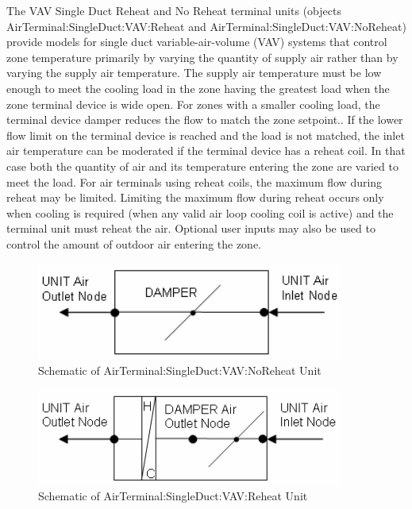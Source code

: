 The VAV Single Duct Reheat and No Reheat terminal units (objects AirTerminal:SingleDuct:VAV:Reheat and AirTerminal:SingleDuct:VAV:NoReheat) provide models for single duct variable-air-volume (VAV) systems that control zone temperature primarily by varying the quantity of supply air rather than by varying the supply air temperature. The supply air temperature must be low enough to meet the cooling load in the zone having the greatest load when the zone terminal device is wide open. For zones with a smaller cooling load, the terminal device damper reduces the flow to match the zone setpoint.. If the lower flow limit on the terminal device is reached and the load is not matched, the inlet air temperature can be moderated if the terminal device has a reheat coil. In that case both the quantity of air and its temperature entering the zone are varied to meet the load. For air terminals using reheat coils, the maximum flow during reheat may be limited. Limiting the maximum flow during reheat occurs only when cooling is required (when any valid air loop cooling coil is active) and the terminal unit must reheat the air. Optional user inputs may also be used to control the amount of outdoor air entering the zone.

\begin{figure}[hbtp] %
\centering
\includegraphics[width=0.9\textwidth, height=0.9\textheight, keepaspectratio=true]{media/image2789.png}
\caption{Schematic of AirTerminal:SingleDuct:VAV:NoReheat Unit \protect \label{fig:schematic-of-airterminal-singleduct-vav}}
\end{figure}

\begin{figure}[hbtp] %
\centering
\includegraphics[width=0.9\textwidth, height=0.9\textheight, keepaspectratio=true]{media/image2790.png}
\caption{Schematic of AirTerminal:SingleDuct:VAV:Reheat Unit \protect \label{fig:schematic-of-airterminal-singleduct-vav-001}}
\end{figure}

